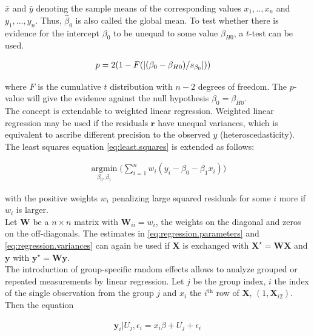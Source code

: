 \documentclass[11pt,a4paper,twoside]{book}\usepackage[]{graphicx}\usepackage[]{color}
\begin{document}
$\bar{x}$ and $\bar{y}$ denoting the sample means of the corresponding values $x_1, .., x_n$ and $y_1, ..., y_n$. Thus, $\hat{\beta}_0$ is also called the global mean.
To test whether there is evidence for the intercept $\beta_0$ to be unequal to some value $\beta_{H0}$, a $t$-test can be used. 

\begin{align}
p &= 2(1-F(\left\lvert(\beta_0 - \beta_{H0})/s_{\beta_0}\right\rvert)) \nonumber
\end{align}

where $F$ is the cumulative $t$ distribution with $n-2$ degrees of freedom. The $p$\hspace{0.4mm}-value will give the evidence against the null hypothesis $\beta_0 = \beta_{H0}$. \\
The concept is extendable to weighted linear regression. Weighted linear regression may be used if the residuals $\mathbf{r}$ have unequal variances, which is equivalent to ascribe different precision to the observed $y$ (heteroscedasticity). The least squares equation \eqref{eq:least.squares} is extended as follows:

\begin{align}
\operatorname*{argmin}_{\beta_0, \beta_1}\Big(\sum_{i = 1}^n w_i(y_i - \beta_0 - \beta_1 x_i)\Big) \nonumber
\end{align}

with the positive weights $w_i$ penalizing large squared residuals for some $i$ more if $w_i$ is larger. \\
Let $\mathbf{W}$ be a $n \times n$ matrix with $\mathbf{W}_{ii} = w_i$, the weights on the diagonal and zeros on the off-diagonals. The estimates in \eqref{eq:regression.parameters} and \eqref{eq:regression.variances} can again be used if $\mathbf{X}$ is exchanged with $\mathbf{X}^\star =  \mathbf{W} \mathbf{X}$ and $\mathbf{y}$ with $\mathbf{y}^\star = \mathbf{W} \mathbf{y}$. \label{weighted.regression} \\
The introduction of group-specific random effects allows to analyze grouped or repeated measurements by linear regression. Let $j$ be the group index, $i$ the index of the single observation from the group $j$ and $x_i$ the $i^\textrm{th}$ row of $\mathbf{X}$, $(1, \mathbf{X}_{i2})$. Then the equation

\begin{align}
\mathbf{y}_i|U_j,\epsilon_{i} =  x_i\beta + U_j + \epsilon_{i} \label{eq:one.random.intercept}
\end{align}
\end{document}

